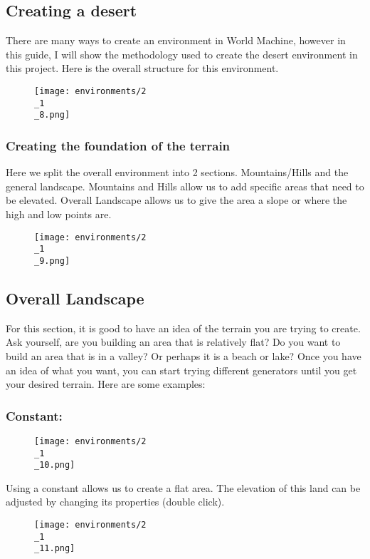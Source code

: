 \documentclass[../main.tex]{subfiles}
\begin{document}
\subsection{Creating a desert}
There are many ways to create an environment in World Machine, however in this guide, I will show the methodology used to create the desert environment in this project.
Here is the overall structure for this environment.
\begin{figure}[H]
\texttt{[image: environments/2\\\_1\\\_8.png]}
\end{figure}
\subsubsection{Creating the foundation of the terrain}
Here we split the overall environment into 2 sections. Mountains/Hills and the general landscape. Mountains and Hills allow us to add specific areas that need to be elevated.
Overall Landscape allows us to give the area a slope or where the high and low points are.
\begin{figure}[H]
\texttt{[image: environments/2\\\_1\\\_9.png]}
\end{figure}
\subsection{Overall Landscape}
For this section, it is good to have an idea of the terrain you are trying to create.
Ask yourself, are you building an area that is relatively flat? Do you want to build an area that is in a valley? Or perhaps it is a beach or lake?
Once you have an idea of what you want, you can start trying different generators until you get your desired terrain. Here are some examples:

\subsubsection{Constant:}
\begin{figure}[H]
\texttt{[image: environments/2\\\_1\\\_10.png]}
\end{figure}
Using a constant allows us to create a flat area. The elevation of this land can be adjusted by changing its properties (double click).
\begin{figure}[H]
\texttt{[image: environments/2\\\_1\\\_11.png]}
\end{figure}
\end{document}
